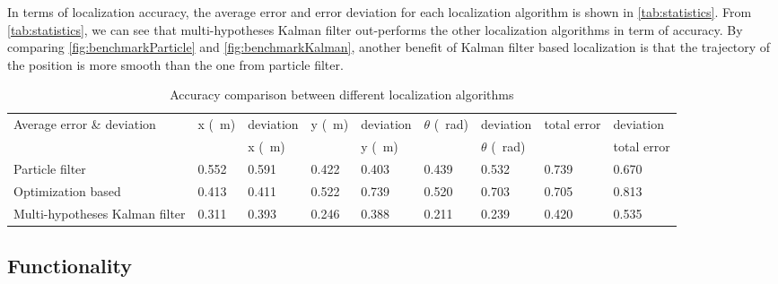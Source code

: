 

In terms of localization accuracy, the average error and error deviation for each localization algorithm is shown in \autoref{tab:statistics}. From \autoref{tab:statistics}, we can see that multi-hypotheses Kalman filter out-performs the other localization algorithms in term of accuracy. By comparing \autoref{fig:benchmarkParticle} and \autoref{fig:benchmarkKalman}, another benefit of  Kalman filter based localization is that the trajectory of the position is more smooth than the one from particle filter.
\begin{table}[h!]
  \centering
  \caption{Accuracy comparison between different localization algorithms}
  \label{tab:statistics}
  \begin{adjustbox}{max width=\textwidth}
    \begin{tabular}{l|l|l|l|l|l|l|l|l}
      Average error  \& deviation & x (\SI{}{\meter})                   &  deviation     & y  (\SI{}{\meter})                   & deviation        & $\theta$  (\SI{}{\radian})            &deviation    & total error         &deviation           \\
      &                     & x (\SI{}{\meter})&                     &  y (\SI{}{\meter})&                     &  $\theta$ (\SI{}{\radian}) &                     & total error\\ \hline
      Particle filter                & 0.552& 0.591 & 0.422 & 0.403 & 0.439 & 0.532 & 0.739 & 0.670   \\ \hline
      Optimization based            & 0.413 & 0.411 & 0.522 & 0.739 & 0.520 & 0.703 & 0.705 & 0.813   \\ \hline
      Multi-hypotheses Kalman filter & 0.311 & 0.393 & 0.246 & 0.388 & 0.211 & 0.239 & 0.420 & 0.535  
    \end{tabular}
  \end{adjustbox}
\end{table}

\subsection{Functionality}
\label{sub:Functionality}

